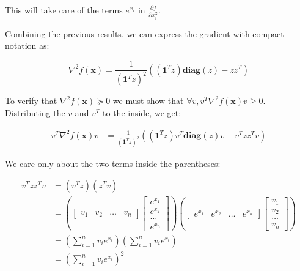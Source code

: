 \documentclass{article}
\begin{document}
This will take care of the terms $e^{x_i}$ in $\frac{\partial f}{\partial x_i^2}$.

Combining the previous results, we can express the gradient with compact notation as:

\begin{equation}
    \nabla^2 f(\bm{x}) = \frac{1}{(\bm{1}^{T} z)^2} \left( (\bm{1}^{T} z) \bm{diag}(z) - z z^T \right)
\end{equation}

To verify that $ \nabla^2 f(\bm{x}) \succeq 0 $ we must show that $ \forall v, v^T \nabla^2 f(\bm{x}) v \geq 0 $.
Distributing the $v$ and $v^T$ to the inside, we get:

\begin{align}
    v^T \nabla^2 f(\bm{x}) v & = \frac{1}{(\bm{1}^{T} z)^2} \left( (\bm{1}^{T} z) v^T \bm{diag}(z) v - v^T z z^T v \right)
\end{align}

We care only about the two terms inside the parentheses:

\begin{align}
    v^T z z^T v & = (v^T z) (z^T v)                                                                     \\
                & =
    \left(
    \begin{bmatrix}
            v_1   &
            v_2   &
            \dots &
            v_n
        \end{bmatrix}
    \begin{bmatrix}
            e^{x_1} \\
            e^{x_2} \\
            \dots   \\
            e^{x_n}
        \end{bmatrix}
    \right)
    \left(
    \begin{bmatrix}
            e^{x_1} &
            e^{x_2} &
            \dots   &
            e^{x_n}
        \end{bmatrix}
    \begin{bmatrix}
            v_1   \\
            v_2   \\
            \dots \\
            v_n
        \end{bmatrix}
    \right)                                                                                             \\
                & = \left( \sum_{i=1}^{n} v_i e^{x_i} \right) \left( \sum_{i=1}^{n} v_i e^{x_i} \right) \\
                & = \left( \sum_{i=1}^{n} v_i e^{x_i} \right)^2
\end{align}
\end{document}
